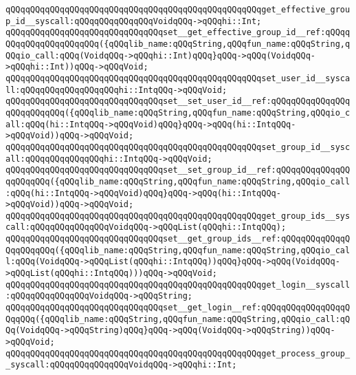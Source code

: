 \verb|qQQqqQQqqQQqqQQqqQQqqQQqqQQqqQQqqQQqqQQqqQQqqQQqqQQqget_effective_group_id__syscall:qQQqqQQqqQQqqQQqVoidqQQq->qQQqhi::Int;|\newline
\verb|qQQqqQQqqQQqqQQqqQQqqQQqqQQqqQQqset__get_effective_group_id__ref:qQQqqQQqqQQqqQQqqQQqqQQq({qQQqlib_name:qQQqString,qQQqfun_name:qQQqString,qQQqio_call:qQQq(VoidqQQq->qQQqhi::Int)qQQq}qQQq->qQQq(VoidqQQq->qQQqhi::Int))qQQq->qQQqVoid;|\newline
\newline
\verb|qQQqqQQqqQQqqQQqqQQqqQQqqQQqqQQqqQQqqQQqqQQqqQQqqQQqset_user_id__syscall:qQQqqQQqqQQqqQQqqQQqhi::IntqQQq->qQQqVoid;|\newline
\verb|qQQqqQQqqQQqqQQqqQQqqQQqqQQqqQQqset__set_user_id__ref:qQQqqQQqqQQqqQQqqQQqqQQqqQQq({qQQqlib_name:qQQqString,qQQqfun_name:qQQqString,qQQqio_call:qQQq(hi::IntqQQq->qQQqVoid)qQQq}qQQq->qQQq(hi::IntqQQq->qQQqVoid))qQQq->qQQqVoid;|\newline
\newline
\verb|qQQqqQQqqQQqqQQqqQQqqQQqqQQqqQQqqQQqqQQqqQQqqQQqqQQqset_group_id__syscall:qQQqqQQqqQQqqQQqhi::IntqQQq->qQQqVoid;|\newline
\verb|qQQqqQQqqQQqqQQqqQQqqQQqqQQqqQQqset__set_group_id__ref:qQQqqQQqqQQqqQQqqQQqqQQq({qQQqlib_name:qQQqString,qQQqfun_name:qQQqString,qQQqio_call:qQQq(hi::IntqQQq->qQQqVoid)qQQq}qQQq->qQQq(hi::IntqQQq->qQQqVoid))qQQq->qQQqVoid;|\newline
\newline
\verb|qQQqqQQqqQQqqQQqqQQqqQQqqQQqqQQqqQQqqQQqqQQqqQQqqQQqget_group_ids__syscall:qQQqqQQqqQQqqQQqVoidqQQq->qQQqList(qQQqhi::IntqQQq);|\newline
\verb|qQQqqQQqqQQqqQQqqQQqqQQqqQQqqQQqset__get_group_ids__ref:qQQqqQQqqQQqqQQqqQQqqQQq({qQQqlib_name:qQQqString,qQQqfun_name:qQQqString,qQQqio_call:qQQq(VoidqQQq->qQQqList(qQQqhi::IntqQQq))qQQq}qQQq->qQQq(VoidqQQq->qQQqList(qQQqhi::IntqQQq)))qQQq->qQQqVoid;|\newline
\newline
\verb|qQQqqQQqqQQqqQQqqQQqqQQqqQQqqQQqqQQqqQQqqQQqqQQqqQQqget_login__syscall:qQQqqQQqqQQqqQQqVoidqQQq->qQQqString;|\newline
\verb|qQQqqQQqqQQqqQQqqQQqqQQqqQQqqQQqset__get_login__ref:qQQqqQQqqQQqqQQqqQQqqQQq({qQQqlib_name:qQQqString,qQQqfun_name:qQQqString,qQQqio_call:qQQq(VoidqQQq->qQQqString)qQQq}qQQq->qQQq(VoidqQQq->qQQqString))qQQq->qQQqVoid;|\newline
\newline
\verb|qQQqqQQqqQQqqQQqqQQqqQQqqQQqqQQqqQQqqQQqqQQqqQQqqQQqget_process_group__syscall:qQQqqQQqqQQqqQQqVoidqQQq->qQQqhi::Int;|\newline
